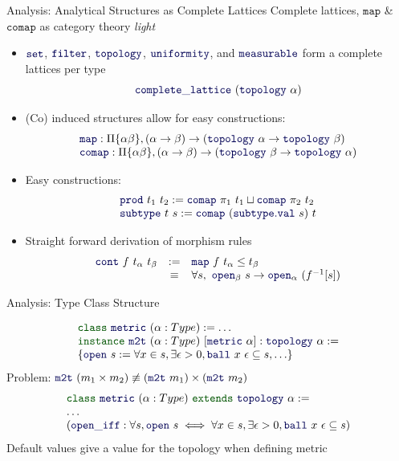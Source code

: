 \documentclass{beamer}
\newcommand{\kw}[1]{{\color{green!33!black}\ensuremath{\mathtt{#1}}}}
\newcommand{\ident}[1]{{\color{blue!33!black}\ensuremath{\mathtt{#1}}}}
\begin{document}
\begin{frame}{Analysis: Analytical Structures as Complete Lattices}
  Complete lattices, \ident{map} \& \ident{comap} as category theory \emph{light}
  \begin{itemize}[<+->]
    \item $\ident{set}$, $\ident{filter}$, $\ident{topology}$, $\ident{uniformity}$, 
    and $\ident{measurable}$ form a complete lattices per type
    \[ \ident{complete\_lattice}~(\ident{topology}~\alpha) \]
    \item (Co) induced structures allow for easy constructions:
    \[ \begin{array}{l}
      \ident{map} : \Pi \{ \alpha \beta \},
        (\alpha \to \beta) \to
        (\ident{topology}~\alpha \to \ident{topology}~\beta) \\
      \ident{comap} : \Pi \{ \alpha \beta \},
        (\alpha \to \beta) \to
        (\ident{topology}~\beta \to \ident{topology}~\alpha)
    \end{array} \]
    \item Easy constructions:
    \[ \begin{array}{l}
      \ident{prod}~t_1~t_2 := \ident{comap}~\pi_1~t_1 \sqcup  \ident{comap}~\pi_2~t_2 \\
      \ident{subtype}~t~s := \ident{comap}~(\ident{subtype.val}~s)~t
    \end{array} \]
    \item Straight forward derivation of morphism rules
    \[ \begin{array}{lcl}
        \ident{cont}~f~t_{\alpha}~t_{\beta} & := &
        \ident{map}~f~t_\alpha \le t_\beta \\
        & \equiv & \forall s,~\ident{open}_\beta~s \to
             \ident{open}_\alpha~(f^{-1}[s])
      \end{array} \]
  \end{itemize}
\end{frame}

\begin{frame}{Analysis: Type Class Structure}

  \[ \begin{array}{l}
    \kw{class}~\ident{metric}~(\alpha : Type) := \ldots \\
    \kw{instance}~\ident{m2t}~(\alpha : Type)~[\ident{metric}~\alpha] :
    \ident{topology}~\alpha := \\
    \{ \ident{open}~s := \forall x \in s, \exists \epsilon > 0,
    \ident{ball}~x~\epsilon \subseteq s, \ldots \}
  \end{array} \]
\pause
  \alert{Problem}:
    $\ident{m2t}~(m_1 \times m_2) \not\equiv (\ident{m2t}~m_1) \times (\ident{m2t}~m_2)$
\pause
  \[ \begin{array}{l}
    \kw{class}~\ident{metric}~(\alpha : Type) ~\kw{extends}~\ident{topology}~\alpha := \\
    \ldots \\
    (\ident{open\_iff} : \forall s, \ident{open}~s \iff \forall x \in s, \exists \epsilon > 0,
      \ident{ball}~x~\epsilon \subseteq s)
  \end{array} \]
\pause
  Default values give a value for the topology when defining metric
\end{frame}
\end{document}
